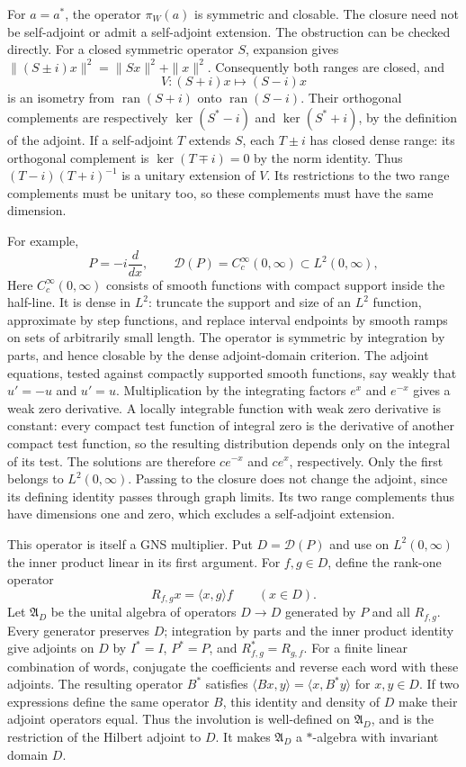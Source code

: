 \documentclass[11pt]{article}
\numberwithin{equation}{section}
\begin{document}
For $a=a^*$, the operator $\pi_W(a)$ is symmetric and closable.
The closure need not be self-adjoint or admit a self-adjoint extension.
The obstruction can be checked directly.  For a closed symmetric operator
$S$, expansion gives
$\|(S\pm i)x\|^2=\|Sx\|^2+\|x\|^2$.
Consequently both ranges are closed, and
\[
 V:(S+i)x\longmapsto(S-i)x
\]
is an isometry from $\operatorname{ran}(S+i)$ onto
$\operatorname{ran}(S-i)$.  Their orthogonal complements are respectively
$\ker(S^*-i)$ and $\ker(S^*+i)$, by the definition of the adjoint.
If a self-adjoint $T$ extends $S$, each $T\pm i$ has closed dense range:
its orthogonal complement is $\ker(T\mp i)=0$ by the norm identity.
Thus $(T-i)(T+i)^{-1}$ is a unitary extension of $V$.
Its restrictions to the two range complements must be unitary too, so
these complements must have the same dimension.

For example,
\[
 P=-i\frac{d}{dx},\qquad \mathcal D(P)=C_c^\infty(0,\infty)
 \subset L^2(0,\infty),
\]
Here $C_c^\infty(0,\infty)$ consists of smooth functions with compact
support inside the half-line.  It is dense in $L^2$: truncate the support
and size of an $L^2$ function, approximate by step functions, and replace interval endpoints
by smooth ramps on sets of arbitrarily small length.  The operator is
symmetric by integration by parts, and hence closable by the dense
adjoint-domain criterion.  The adjoint equations, tested against compactly
supported smooth functions, say weakly that $u'=-u$ and $u'=u$.
Multiplication by the integrating factors $e^x$ and $e^{-x}$ gives a weak
zero derivative.  A locally integrable function with weak zero derivative
is constant: every compact test function of integral zero is the derivative
of another compact test function, so the resulting distribution depends
only on the integral of its test.  The solutions are therefore $ce^{-x}$
and $ce^x$, respectively.  Only the first belongs to $L^2(0,\infty)$.
Passing to the closure does not change the adjoint, since its defining
identity passes through graph limits.  Its two range complements thus
have dimensions one and zero, which excludes a self-adjoint extension.

This operator is itself a GNS multiplier.  Put $D=\mathcal D(P)$ and use
on $L^2(0,\infty)$ the inner product linear in its first argument.
For $f,g\in D$, define the rank-one operator
\[
 R_{f,g}x=\langle x,g\rangle f\qquad(x\in D).
\]
Let $\mathfrak A_D$ be the unital algebra of operators $D\to D$
generated by $P$ and all $R_{f,g}$.  Every generator preserves $D$;
integration by parts and the inner product identity give adjoints on $D$
by $I^*=I$, $P^*=P$, and $R_{f,g}^*=R_{g,f}$.  For a finite linear combination of
words, conjugate the coefficients and reverse each word with these
adjoints.  The resulting operator $B^*$ satisfies
$\langle Bx,y\rangle=\langle x,B^*y\rangle$ for $x,y\in D$.
If two expressions define the same operator $B$, this identity and density
of $D$ make their adjoint operators equal.  Thus the involution is
well-defined on $\mathfrak A_D$, and is the restriction of the Hilbert
adjoint to $D$.  It makes $\mathfrak A_D$ a $*$-algebra with invariant
domain $D$.
\end{document}
